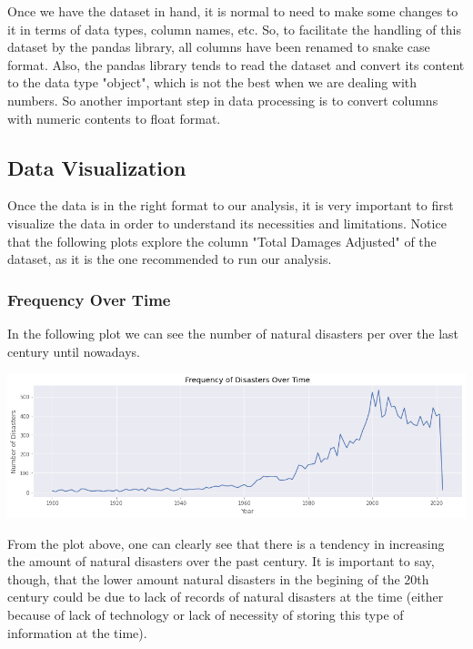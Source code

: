 \documentclass[paper=a4, fontsize=11pt]{scrartcl} %
\begin{document}
Once we have the dataset in hand, it is normal to need to make some changes to it in terms of data types, column names, etc. So, to facilitate the handling of this dataset by the pandas library, all columns have been renamed to snake case format. Also, the pandas library tends to read the dataset and convert its content to the data type "object", which is not the best when we are dealing with numbers. So another important step in data processing is to convert columns with numeric contents to float format. 

\subsection{Data Visualization}

Once the data is in the right format to our analysis, it is very important to first visualize the data in order to understand its necessities and limitations. Notice that the following plots explore the column "Total Damages Adjusted" of the dataset, as it is the one recommended to run our analysis.

\subsubsection{Frequency Over Time}

In the following plot we can see the number of natural disasters per over the last century until nowadays. 

\begin{center}
    \includegraphics[scale=0.5]{imgs/frequency_of_disasters_over_time.png}
\end{center}

From the plot above, one can clearly see that there is a tendency in increasing the amount of natural disasters over the past century. It is important to say, though, that the lower amount natural disasters in the begining of the 20th century could be due to lack of records of natural disasters at the time (either because of lack of technology or lack of necessity of storing this type of information at the time).
\end{document}
